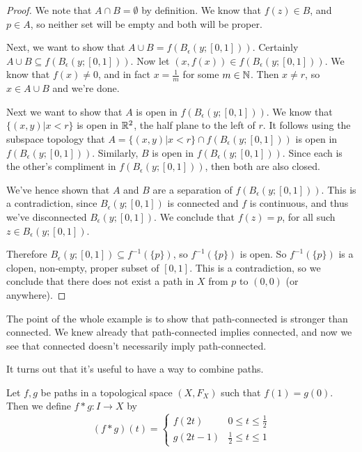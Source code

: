 \begin{proof}
We note that $A\cap B = \emptyset$ by definition. We know that $f(z)\in B$, and $p\in A$, so neither set will be empty and both will be proper.

Next, we want to show that $A\cup B = f\left( B_\epsilon (y;[0,1]) \right)$. Certainly $A\cup B \subseteq f\left( B_{\epsilon} (y;[0,1]) \right)$. Now let $(x, f(x)) \in f\left( B_{\epsilon} (y;[0,1]) \right)$. We know that $f(x) \neq 0$, and in fact $x = \frac{1}{m}$ for some $m\in \mathbb N$. Then $x\neq r$, so $x\in A\cup B$ and we're done.

Next we want to show that $A$ is open in $f(B_{\epsilon} (y;[0,1]))$. We know that $\{(x,y) | x<r \}$ is open in $\mathbb R^2$, the half plane to the left of $r$. It follows using the subspace topology that $A = \{ (x,y) | x< r \} \cap f\left( B_{\epsilon} (y;[0,1]) \right)$ is open in $f\left( B_{\epsilon} (y;[0,1] ) \right)$. Similarly, $B$ is open in $f\left( B_{\epsilon} (y;[0,1] ) \right)$. Since each is the other's compliment in $f\left( B_{\epsilon} (y;[0,1] ) \right)$, then both are also closed.

We've hence shown that $A$ and $B$ are a separation of $f\left( B_{\epsilon} (y;[0,1] ) \right)$. This is a contradiction, since $B_{\epsilon} (y;[0,1])$ is connected and $f$ is continuous, and thus we've disconnected $B_{\epsilon}(y;[0,1])$. We conclude that $f(z) = p$, for all such $z\in B_{\epsilon}(y;[0,1])$. 

Therefore $B_{\epsilon} (y;[0,1]) \subseteq f^{-1}(\{ p\})$, so $f^{-1} (\{p\})$ is open. So $f^{-1}( \{ p \} )$ is a clopen, non-empty, proper subset of $[0,1]$. This is a contradiction, so we conclude that there does not exist a path in $X$ from $p$ to $(0,0)$ (or anywhere). 
\end{proof}

The point of the whole example is to show that path-connected is stronger than connected. We knew already that path-connected implies connected, and now we see that connected doesn't necessarily imply path-connected.

It turns out that it's useful to have a way to combine paths. 
\begin{definition}
Let $f,g$ be paths in a topological space $(X,F_X)$ such that $f(1) = g(0)$. Then we define $f\ast g : I \to X$ by
\[ (f\ast g )(t) = 
\begin{cases}
f(2t) & 0 \leq t\leq \frac{1}{2} \\
g(2t-1) & \frac{1}{2} \leq t \leq 1 
\end{cases}
\]
\end{definition}

